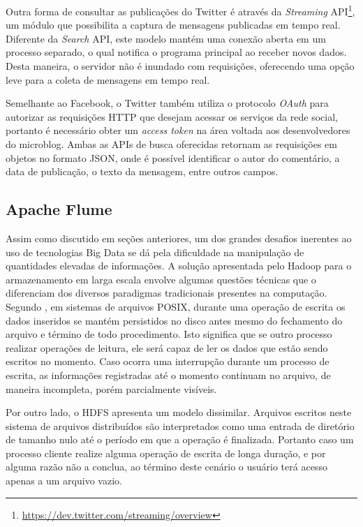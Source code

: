 Outra forma de consultar as publicações do Twitter é através da \textit{Streaming} API\footnote{\url{https://dev.twitter.com/streaming/overview}}, um módulo que possibilita a captura de mensagens publicadas em tempo real. Diferente da \textit{Search} API, este modelo mantém uma conexão aberta em um processo separado, o qual notifica o programa principal ao receber novos dados. Desta maneira, o servidor não é inundado com requisições, oferecendo uma opção leve para a coleta de mensagens em tempo real.

Semelhante ao Facebook, o Twitter também utiliza o protocolo \textit{OAuth} para autorizar as requisições HTTP que desejam acessar os serviços da rede social, portanto é necessário obter um \textit{access token} na área voltada aos desenvolvedores do microblog. Ambas as APIs de busca oferecidas retornam as requisições em objetos no formato JSON, onde é possível identificar o autor do comentário, a data de publicação, o texto da mensagem, entre outros campos.

\subsection{Apache Flume}

Assim como discutido em seções anteriores, um dos grandes desafios inerentes ao uso de tecnologias Big Data se dá pela dificuldade na manipulação de quantidades elevadas de informações. A solução apresentada pelo Hadoop para o armazenamento em larga escala envolve algumas questões técnicas que o diferenciam dos diversos paradigmas tradicionais presentes na computação. Segundo , em sistemas de arquivos POSIX, durante uma operação de escrita os dados inseridos se mantém persistidos no disco antes mesmo do fechamento do arquivo e término de todo procedimento. Isto significa que se outro processo realizar operações de leitura, ele será capaz de ler os dados que estão sendo escritos no momento. Caso ocorra uma interrupção durante um processo de escrita, as informações registradas até o momento continuam no arquivo, de maneira incompleta, porém parcialmente visíveis.

Por outro lado, o HDFS apresenta um modelo dissimilar. Arquivos escritos neste sistema de arquivos distribuídos são interpretados como uma entrada de diretório de tamanho nulo até o período em que a operação é finalizada. Portanto caso um processo cliente realize alguma operação de escrita de longa duração, e por alguma razão não a conclua, ao término deste cenário o usuário terá acesso apenas a um arquivo vazio.


